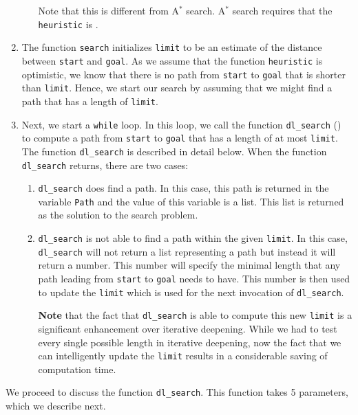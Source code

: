 \begin{enumerate}
\begin{enumerate}
            Note that this is different from A$^*$ search. A$^*$ search requires that the \texttt{heuristic} is 
            .
     \end{enumerate}
\item The function \texttt{search} initializes \texttt{limit} to be an estimate of the distance
      between \texttt{start} and \texttt{goal}.  As we assume that the function \texttt{heuristic} is
      optimistic, we know that there is no path from \texttt{start} to \texttt{goal} that is shorter than
      \texttt{limit}.  Hence, we start our search by assuming that we might find a path that has a length of
      \texttt{limit}.
\item Next, we start a \texttt{while} loop.  In this loop, we call the function \texttt{dl\_search} 
      () to compute a path from
      \texttt{start} to \texttt{goal} that has a length of at most \texttt{limit}.  The function
      \texttt{dl\_search}  is described in detail below.
      When the function \texttt{dl\_search} returns, there are two cases:
      \begin{enumerate}
      \item \texttt{dl\_search} does find a path.  In this case, this path is returned in the variable
            \texttt{Path} and the value of this variable is a list.  This list is returned as the solution to
            the search problem.
      \item \texttt{dl\_search} is not able to find a path within the given \texttt{limit}.  In this case,
            \texttt{dl\_search} will not return a list representing a path but instead it will return a number.
            This number will specify the minimal length that any path leading from \texttt{start} to \texttt{goal} needs to
            have.  This number is then used to update the \texttt{limit} which is used for the next
            invocation of \texttt{dl\_search}.

            \textbf{Note} that the fact that \texttt{dl\_search} is able to compute this new \texttt{limit} is
            a significant enhancement over iterative deepening.  While we had to test every single possible
            length in iterative deepening, now the fact that we can intelligently update the \texttt{limit}
            results in a considerable saving of computation time.
      \end{enumerate}
\end{enumerate}
We proceed to discuss the function \texttt{dl\_search}.  This function takes 5 parameters, which we describe next.
